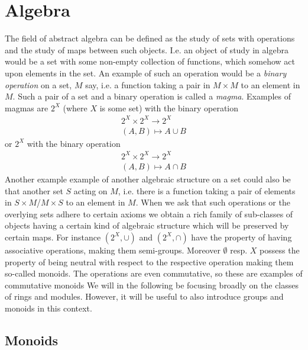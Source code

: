 \section{Algebra}
The field of abstract algebra can be defined as the study of sets with operations and the study of maps between such objects. I.e. an object of study in algebra would be a set with some non-empty collection of functions, which somehow act upon elements in the set. An example of such an operation would be a \textit{binary operation} on a set, $M$ say, i.e. a function taking a pair in $M\times M$ to an element in $M$. Such a pair of a set and a binary operation is called a \textit{magma}. Examples of magmas are $2^X$ (where $X$ is some set) with the binary operation
\begin{gather*}
    2^X\times 2^X \rightarrow 2^X\\
    (A,B)\mapsto A\cup B
\end{gather*}
or $2^X$ with the binary operation
\begin{gather*}
    2^X \times 2^X \rightarrow 2^X\\
    (A,B)\mapsto A\cap B
\end{gather*}
 Another example example of another algebraic structure on a set could also be that another set $S$ acting on $M$, i.e. there is a function taking a pair of elements in $S\times M$/$M\times S$ to an element in $M$. When we ask that such operations or the overlying sets adhere to certain axioms we obtain a rich family of sub-classes of objects having a certain kind of algebraic structure which will be preserved by certain maps. For instance $(2^X, \cup)$ and $(2^X,\cap)$ have the property of having associative operations, making them semi-groups. Moreover $\emptyset$ resp. $X$ possess the property of being neutral with respect to the respective operation making them so-called monoids. The operations are even commutative, so these are examples of commutative monoids We will in the following be focusing broadly on the classes of rings and modules. However, it will be useful to also introduce groups and monoids in this context.
\subsection{Monoids}

